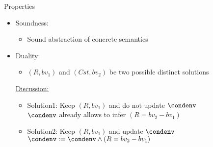 \begin{frame}{Properties}
      \begin{itemize}
      \item Soundness: 
      \begin{itemize}
      \item Sound abstraction of concrete semantics
      \end{itemize}
      \bigskip
      \item Duality: 
      \begin{itemize}
      \item {\scriptsize $(R, bv_1)$ and $(Cst, bv_2)$} {\color{blue}{can now}} be two possible distinct solutions\\
      \end{itemize}
      \bigskip 
      \underline{Discussion:}
      \begin{itemize}
      \item Solution1: Keep $(R, bv_1)$ and do not update $\condenv$\\
                       $\condenv$ already allows to infer $(R = bv_2 - bv_1)$
      \bigskip
      \item Solution2: Keep $(R, bv_1)$ and update $\condenv$\\
                       $\condenv := \condenv \wedge (R = bv_2 - bv_1)$
      \end{itemize}

      \end{itemize}
\end{frame}



